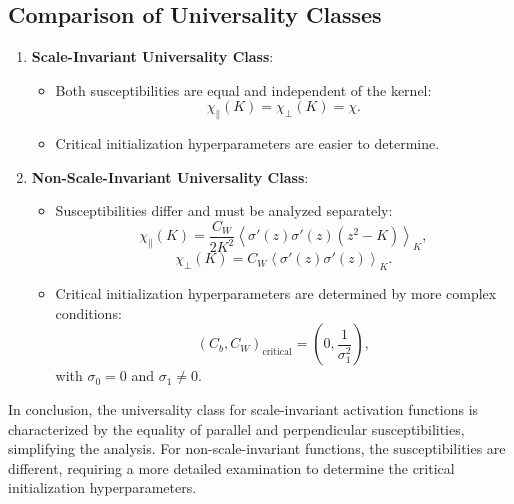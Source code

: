\documentclass{article}
\begin{document}
\subsection*{Comparison of Universality Classes}

\begin{enumerate}
    \item \textbf{Scale-Invariant Universality Class}:
    \begin{itemize}
        \item Both susceptibilities are equal and independent of the kernel:
        \[
        \chi_{\parallel}(K) = \chi_{\perp}(K) = \chi.
        \]
        \item Critical initialization hyperparameters are easier to determine.
    \end{itemize}

    \item \textbf{Non-Scale-Invariant Universality Class}:
    \begin{itemize}
        \item Susceptibilities differ and must be analyzed separately:
        \[
        \chi_{\parallel}(K) = \frac{C_W}{2K^2} \left\langle \sigma'(z)\sigma'(z)(z^2 - K) \right\rangle_K,
        \]
        \[
        \chi_{\perp}(K) = C_W \left\langle \sigma'(z) \sigma'(z) \right\rangle_K.
        \]
        \item Critical initialization hyperparameters are determined by more complex conditions:
        \[
        (C_b, C_W)_{\text{critical}} = \left(0, \frac{1}{\sigma_1^2}\right),
        \]
        with $\sigma_0 = 0$ and $\sigma_1 \neq 0$.
    \end{itemize}
\end{enumerate}

In conclusion, the universality class for scale-invariant activation functions is characterized by the equality of parallel and perpendicular susceptibilities, simplifying the analysis. For non-scale-invariant functions, the susceptibilities are different, requiring a more detailed examination to determine the critical initialization hyperparameters.
\end{document}
